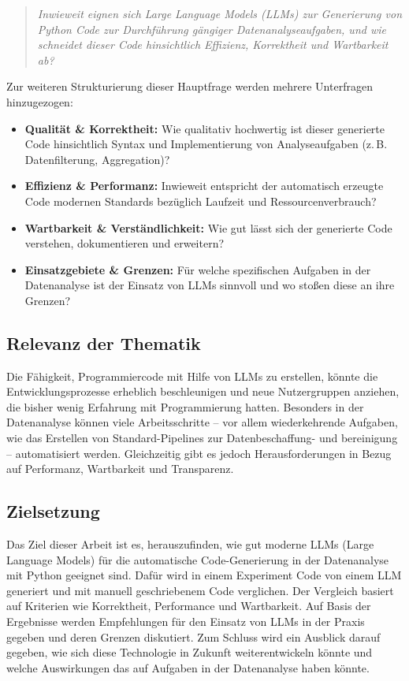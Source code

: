 \documentclass[11pt,a4paper]{article}
\begin{document}
\begin{quote}
    \emph{Inwieweit eignen sich Large Language Models (LLMs) zur Generierung von Python Code zur Durchführung gängiger Datenanalyseaufgaben, und wie schneidet dieser Code hinsichtlich Effizienz, Korrektheit und Wartbarkeit ab?}
\end{quote}

Zur weiteren Strukturierung dieser Hauptfrage werden mehrere Unterfragen hinzugezogen:
\begin{itemize}
    \item \textbf{Qualität \& Korrektheit:} Wie qualitativ hochwertig ist dieser generierte Code hinsichtlich Syntax und Implementierung von Analyseaufgaben (z.\,B. Datenfilterung, Aggregation)?
    \item \textbf{Effizienz \& Performanz:} Inwieweit entspricht der automatisch erzeugte Code modernen Standards bezüglich Laufzeit und Ressourcenverbrauch?
    \item \textbf{Wartbarkeit \& Verständlichkeit:} Wie gut lässt sich der generierte Code verstehen, dokumentieren und erweitern?
    \item \textbf{Einsatzgebiete \& Grenzen:} Für welche spezifischen Aufgaben in der Datenanalyse ist der Einsatz von LLMs sinnvoll und wo stoßen diese an ihre Grenzen?
\end{itemize}

\subsection{Relevanz der Thematik}
Die Fähigkeit, Programmiercode mit Hilfe von LLMs zu erstellen, könnte die Entwicklungsprozesse erheblich beschleunigen und neue Nutzergruppen anziehen, die bisher wenig Erfahrung mit Programmierung hatten. Besonders in der Datenanalyse können viele Arbeitsschritte – vor allem wiederkehrende Aufgaben, wie das Erstellen von Standard-Pipelines zur Datenbeschaffung- und bereinigung – automatisiert werden. Gleichzeitig gibt es jedoch Herausforderungen in Bezug auf Performanz, Wartbarkeit und Transparenz.

\subsection{Zielsetzung}
Das Ziel dieser Arbeit ist es, herauszufinden, wie gut moderne LLMs (Large Language Models) für die automatische Code-Generierung in der Datenanalyse mit Python geeignet sind. Dafür wird in einem Experiment Code von einem LLM generiert und mit manuell geschriebenem Code verglichen. Der Vergleich basiert auf Kriterien wie Korrektheit, Performance und Wartbarkeit. Auf Basis der Ergebnisse werden Empfehlungen für den Einsatz von LLMs in der Praxis gegeben und deren Grenzen diskutiert. Zum Schluss wird ein Ausblick darauf gegeben, wie sich diese Technologie in Zukunft weiterentwickeln könnte und welche Auswirkungen das auf Aufgaben in der Datenanalyse haben könnte.
\end{document}
